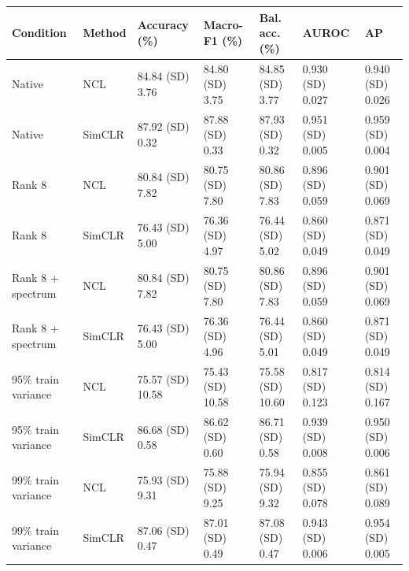 \begin{tabular}{lllllll}
\toprule
Condition & Method & Accuracy (\%) & Macro-F1 (\%) & Bal. acc. (\%) & AUROC & AP \\
\midrule
Native & NCL & 84.84 (SD) 3.76 & 84.80 (SD) 3.75 & 84.85 (SD) 3.77 & 0.930 (SD) 0.027 & 0.940 (SD) 0.026 \\
Native & SimCLR & 87.92 (SD) 0.32 & 87.88 (SD) 0.33 & 87.93 (SD) 0.32 & 0.951 (SD) 0.005 & 0.959 (SD) 0.004 \\
Rank 8 & NCL & 80.84 (SD) 7.82 & 80.75 (SD) 7.80 & 80.86 (SD) 7.83 & 0.896 (SD) 0.059 & 0.901 (SD) 0.069 \\
Rank 8 & SimCLR & 76.43 (SD) 5.00 & 76.36 (SD) 4.97 & 76.44 (SD) 5.02 & 0.860 (SD) 0.049 & 0.871 (SD) 0.049 \\
Rank 8 + spectrum & NCL & 80.84 (SD) 7.82 & 80.75 (SD) 7.80 & 80.86 (SD) 7.83 & 0.896 (SD) 0.059 & 0.901 (SD) 0.069 \\
Rank 8 + spectrum & SimCLR & 76.43 (SD) 5.00 & 76.36 (SD) 4.96 & 76.44 (SD) 5.01 & 0.860 (SD) 0.049 & 0.871 (SD) 0.049 \\
95\% train variance & NCL & 75.57 (SD) 10.58 & 75.43 (SD) 10.58 & 75.58 (SD) 10.60 & 0.817 (SD) 0.123 & 0.814 (SD) 0.167 \\
95\% train variance & SimCLR & 86.68 (SD) 0.58 & 86.62 (SD) 0.60 & 86.71 (SD) 0.58 & 0.939 (SD) 0.008 & 0.950 (SD) 0.006 \\
99\% train variance & NCL & 75.93 (SD) 9.31 & 75.88 (SD) 9.25 & 75.94 (SD) 9.32 & 0.855 (SD) 0.078 & 0.861 (SD) 0.089 \\
99\% train variance & SimCLR & 87.06 (SD) 0.47 & 87.01 (SD) 0.49 & 87.08 (SD) 0.47 & 0.943 (SD) 0.006 & 0.954 (SD) 0.005 \\
\bottomrule
\end{tabular}
